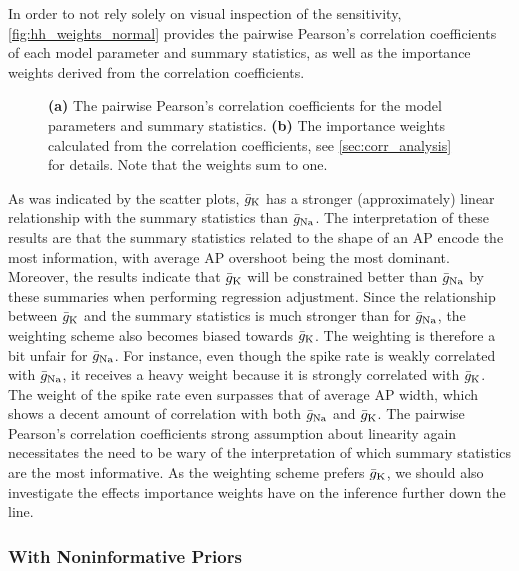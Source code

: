 In order to not rely solely on visual inspection of the sensitivity, \autoref{fig:hh_weights_normal} provides the pairwise Pearson's correlation coefficients of each model parameter and summary statistics, as well as the importance weights derived from the correlation coefficients.
\begin{figure}[!htb]
\centering
{}
\qquad
{}
\caption{\textbf{(a)} The pairwise Pearson's correlation coefficients for the model parameters and summary statistics. \textbf{(b)} The importance weights calculated from the correlation coefficients, see \cref{sec:corr_analysis} for details. Note that the weights sum to one.
}
\label{fig:hh_weights_normal}
\end{figure}
As was indicated by the scatter plots, $\bar{g}_{\mathrm{K}}$ has a stronger (approximately) linear relationship with the summary statistics than $\bar{g}_{\mathrm{Na}}$. The interpretation of these results are that the summary statistics related to the shape of an AP encode the most information, with average AP overshoot being the most dominant. Moreover, the results indicate that $\bar{g}_{\mathrm{K}}$ will be constrained better than $\bar{g}_{\mathrm{Na}}$ by these summaries when performing regression adjustment. Since the relationship between $\bar{g}_{\mathrm{K}}$ and the summary statistics is much stronger than for $\bar{g}_{\mathrm{Na}}$, the weighting scheme also becomes biased towards $\bar{g}_{\mathrm{K}}$. The weighting is therefore a bit unfair for $\bar{g}_{\mathrm{Na}}$. For instance, even though the spike rate is weakly correlated with $\bar{g}_{\mathrm{Na}}$, it receives a heavy weight because it is strongly correlated with $\bar{g}_{\mathrm{K}}$. The weight of the spike rate even surpasses that of average AP width, which shows a decent amount of correlation with both $\bar{g}_{\mathrm{Na}}$ and $\bar{g}_{\mathrm{K}}$. The pairwise Pearson's correlation coefficients strong assumption about linearity again necessitates the need to be wary of the interpretation of which summary statistics are the most informative. As the weighting scheme prefers $\bar{g}_{\mathrm{K}}$, we should also investigate the effects importance weights have on the inference further down the line.

\subsubsection*{With Noninformative Priors}

